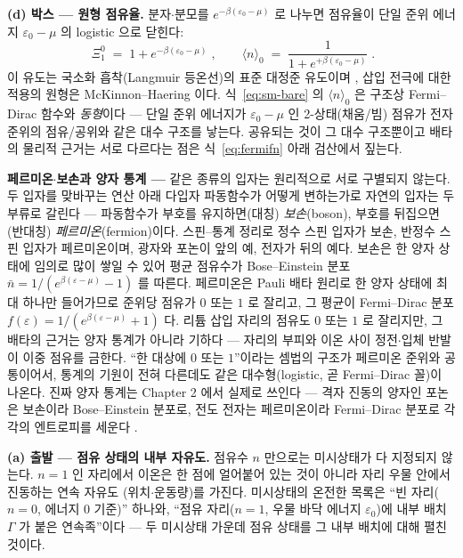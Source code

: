 \textbf{(d) 박스 --- 원형 점유율.} 분자$\cdot$분모를 $e^{-\beta(\varepsilon_0-\mu)}$ 로 나누면 점유율이
단일 준위 에너지 $\varepsilon_0-\mu$ 의 logistic 으로 닫힌다:
\begin{equation}
\boxed{\;\Xi_1^0\;=\;1+e^{-\beta(\varepsilon_0-\mu)}\;,\qquad
\langle n\rangle_0\;=\;\frac{1}{1+e^{+\beta(\varepsilon_0-\mu)}}\;.}
\label{eq:sm-bare}
\end{equation}
이 유도는 국소화 흡착(Langmuir 등온선)의 표준 대정준 유도이며 \cite{hill1960,fowler1939}, 삽입 전극에
대한 적용의 원형은 McKinnon--Haering \cite{mckinnon1983} 이다. 식~\eqref{eq:sm-bare} 의
$\langle n\rangle_0$ 은 구조상 Fermi--Dirac 함수와 \emph{동형}이다 --- 단일 준위 에너지가
$\varepsilon_0-\mu$ 인 2-상태(채움/빔) 점유가 전자 준위의 점유/공위와 같은 대수 구조를 낳는다.
공유되는 것이 그 대수 구조뿐이고 배타의 물리적 근거는 서로 다르다는 점은 식~\eqref{eq:fermifn} 아래
검산에서 짚는다.

\begin{bgbox}
\textbf{페르미온$\cdot$보손과 양자 통계 ---} 같은 종류의 입자는 원리적으로 서로 구별되지 않는다. 두
입자를 맞바꾸는 연산 아래 다입자 파동함수가 어떻게 변하는가로 자연의 입자는 두 부류로 갈린다 --- 파동함수가
부호를 유지하면(대칭) \emph{보손}(boson), 부호를 뒤집으면(반대칭) \emph{페르미온}(fermion)이다.
스핀--통계 정리로 정수 스핀 입자가 보손, 반정수 스핀 입자가 페르미온이며, 광자와 포논이 앞의 예,
전자가 뒤의 예다. 보손은 한 양자 상태에 임의로 많이 쌓일 수 있어 평균 점유수가 Bose--Einstein 분포
$\bar n=1/(e^{\beta(\varepsilon-\mu)}-1)$ 를 따른다. 페르미온은 Pauli 배타 원리로 한 양자 상태에 최대
하나만 들어가므로 준위당 점유가 $0$ 또는 $1$ 로 잘리고, 그 평균이 Fermi--Dirac 분포
$f(\varepsilon)=1/(e^{\beta(\varepsilon-\mu)}+1)$ 다. 리튬 삽입 자리의 점유도 $0$ 또는 $1$ 로 잘리지만,
그 배타의 근거는 양자 통계가 아니라 기하다 --- 자리의 부피와 이온 사이 정전$\cdot$입체 반발이 이중 점유를
금한다. ``한 대상에 $0$ 또는 $1$''이라는 셈법의 구조가 페르미온 준위와 공통이어서, 통계의 기원이 전혀
다른데도 같은 대수형(logistic, 곧 Fermi--Dirac 꼴)이 나온다. 진짜 양자 통계는 Chapter 2 에서 실제로
쓰인다 --- 격자 진동의 양자인 포논은 보손이라 Bose--Einstein 분포로, 전도 전자는 페르미온이라
Fermi--Dirac 분포로 각각의 엔트로피를 세운다 \cite{mcquarrie1976}.
\end{bgbox}

\textbf{(a) 출발 --- 점유 상태의 내부 자유도.} 점유수 $n$ 만으로는 미시상태가 다 지정되지 않는다.
$n=1$ 인 자리에서 이온은 한 점에 얼어붙어 있는 것이 아니라 자리 우물 안에서 진동하는 연속 자유도
(위치$\cdot$운동량)를 가진다. 미시상태의 온전한 목록은 ``빈 자리($n=0$, 에너지 $0$ 기준)'' 하나와,
``점유 자리($n=1$, 우물 바닥 에너지 $\varepsilon_0$)에 내부 배치 $\Gamma$ 가 붙은 연속족''이다 --- 두
미시상태 가운데 점유 상태를 그 내부 배치에 대해 펼친 것이다.

